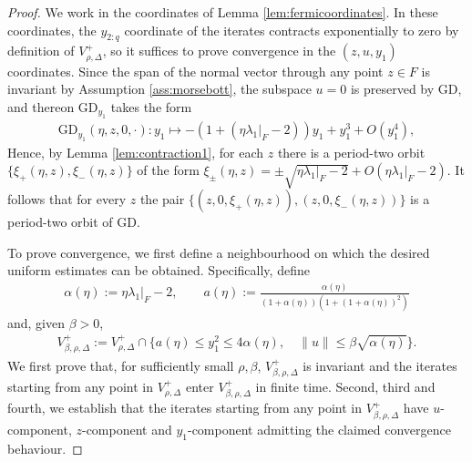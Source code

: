 \documentclass{article}
\newcommand{\GD}{\mathrm{GD}}
\theoremstyle{plain}
\theoremstyle{definition}
\theoremstyle{remark}
\begin{document}
\begin{proof}
    We work in the coordinates of Lemma \ref{lem:fermicoordinates}. In these coordinates, the $y_{2:q}$ coordinate of the iterates contracts exponentially to zero by definition of $V^+_{\rho,\Delta}$, so it suffices to prove convergence in the $(z,u,y_1)$ coordinates. Since the span of the normal vector through any point $z\in F$ is invariant by Assumption \ref{ass:morsebott}, the subspace $u=0$ is preserved by $\GD$, and thereon $\GD_{y_1}$ takes the form
    \begin{align}
        \GD_{y_1}(\eta,z,0,\cdot):y_1\mapsto -(1+(\eta\lambda_1|_F-2))y_1+y_1^3+O(y_1^4),
    \end{align}
    Hence, by Lemma \ref{lem:contraction1}, for each $z$ there is a period-two orbit $\{\xi_+(\eta,z),\xi_-(\eta,z)\}$ of the form $\xi_{\pm}(\eta,z)=\pm\sqrt{\eta\lambda_1|_F-2}+O(\eta\lambda_1|_F-2)$. It follows that for every $z$ the pair $\{(z,0,\xi_+(\eta,z)),(z,0,\xi_-(\eta,z))\}$ is a period-two orbit of $\GD$.

    To prove convergence, we first define a neighbourhood on which the desired uniform estimates can be obtained. Specifically, define
    \begin{align}
        \alpha(\eta):=\eta\lambda_1|_F-2,\qquad a(\eta):=\frac{\alpha(\eta)}{(1+\alpha(\eta))(1+(1+\alpha(\eta))^2)}
    \end{align}
    and, given $\beta>0$,
    \begin{align}
    V_{\beta,\rho,\Delta}^+:=V^+_{\rho,\Delta}\cap\{a(\eta)\leq y_1^2\leq 4\alpha(\eta),\quad \|u\|\leq \beta\sqrt{\alpha(\eta)}\}.
    \end{align}
    We first prove that, for sufficiently small $\rho,\beta$, $V^+_{\beta,\rho,\Delta}$ is invariant and the iterates starting from any point in $V^+_{\rho,\Delta}$ enter $V^+_{\beta,\rho,\Delta}$ in finite time. Second, third and fourth, we establish that the iterates starting from any point in $V^+_{\beta,\rho,\Delta}$ have $u$-component, $z$-component and $y_1$-component admitting the claimed convergence behaviour.
    

\end{proof}
\end{document}
